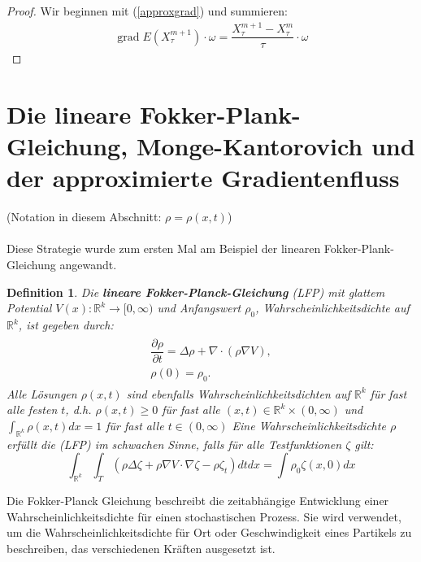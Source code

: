 \documentclass[11pt,a4paper,notitlepage]{scrreprt}
\newcommand{\RR}{\mathbb{R}}
\newcommand{\grad}{\operatorname{grad}}
\newtheorem{defi}{Definition}[section]
\begin{document}
\begin{proof}
Wir beginnen mit (\ref{approxgrad}) und summieren:\\
\begin{align*}
\grad E(X_\tau^{m+1})\cdot\omega= \dfrac{ X_\tau^{m+1}-X_\tau^m}{\tau}\cdot\omega
\end{align*}
\end{proof}

 

\newpage
\section{Die lineare Fokker-Plank-Gleichung, Monge-Kantorovich und der approximierte Gradientenfluss}

(Notation in diesem Abschnitt: $\rho=\rho(x,t)$)\\\\
Diese Strategie wurde zum ersten Mal am Beispiel der linearen Fokker-Plank-Gleichung angewandt. \\
\begin{defi}
Die \textbf{lineare Fokker-Planck-Gleichung} (LFP) mit glattem Potential $V(x):\RR^k\to[0,\infty)$ und Anfangswert $\rho_0$, Wahrscheinlichkeitsdichte auf $\RR^k$, ist gegeben durch:
\begin{eqnarray}
\begin{split}
\dfrac{\partial\rho}{\partial t}=\Delta\rho+\nabla\cdot(\rho\nabla V),\\
\rho(0)=\rho_0.\label{FP}
\end{split}
\end{eqnarray}
Alle Lösungen $\rho(x,t)$ sind ebenfalls Wahrscheinlichkeitsdichten auf $\RR^k$ für fast alle festen $t$, d.h. $\rho(x,t)\geq 0$ für fast alle $(x,t)\in \RR^k\times(0,\infty)$  und $\int_{\RR^k}\rho(x,t)dx=1$ für fast alle $t\in(0,\infty)$
Eine Wahrscheinlichkeitsdichte $\rho$ erfüllt die (LFP) im schwachen Sinne, falls für alle Testfunktionen $\zeta$ gilt:
\begin{equation}
\int_{\RR^k} \int_T (\rho\Delta\zeta+\rho\nabla V\cdot\nabla\zeta -\rho\zeta_t) dt dx=\int\rho_0\zeta(x,0)dx \label{FPweak}
\end{equation}
\end{defi}

Die Fokker-Planck Gleichung beschreibt die zeitabhängige Entwicklung einer Wahrscheinlichkeitsdichte für einen stochastischen Prozess. Sie wird verwendet, um die Wahrscheinlichkeitsdichte für Ort oder Geschwindigkeit eines Partikels zu beschreiben, das verschiedenen Kräften ausgesetzt ist.
\end{document}
